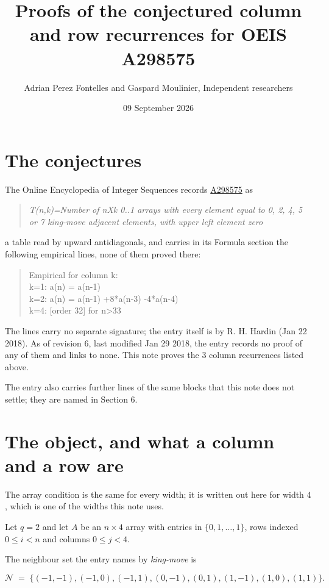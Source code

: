 \documentclass[11pt]{article}
\title{Proofs of the conjectured column and row recurrences for OEIS A298575}
\author{Adrian Perez Fontelles and Gaspard Moulinier, Independent researchers}
\date{09 September 2026}
\theoremstyle{definition}
\begin{document}
\maketitle
\section{The conjectures}

The Online Encyclopedia of Integer Sequences records \href{https://oeis.org/A298575}{A298575} as

\begin{quote}\itshape T(n,k)=Number of nXk 0..1 arrays with every element equal to 0, 2, 4, 5 or 7 king-move adjacent elements, with upper left element zero\end{quote}

a table read by upward antidiagonals, and carries in its Formula section the following empirical lines, none of them proved there:

\begin{quote}\ttfamily Empirical for column k:\\
k=1: a(n) = a(n-1)\\k=2: a(n) = a(n-1) +8*a(n-3) -4*a(n-4)\\k=4: [order 32] for n>33\end{quote}

The lines carry no separate signature; the entry itself is by R. H. Hardin (Jan 22 2018). As of revision 6, last modified Jan 29 2018, the entry records no proof of any of them and links to none. This note proves the 3 column recurrences listed above.

The entry also carries further lines of the same blocks that this note does not settle; they are named in Section 6.

\section{The object, and what a column and a row are}

The array condition is the same for every width; it is written out here for width $4$, which is one of the widths this note uses.

Let $q = 2$ and let $A$ be an $n \times 4$ array with entries in $\{0,1,\dots,1\}$, rows indexed $0 \le i < n$ and columns $0 \le j < 4$.

The neighbour set the entry names by {\itshape king-move} is

\[\mathcal{N} \;=\; \{(-1,-1), (-1,0), (-1,1), (0,-1), (0,1), (1,-1), (1,0), (1,1)\}.\]
\end{document}
